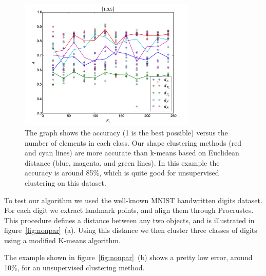 \documentclass[simplex.tex]{subfiles}
\begin{document}
\begin{figure}[h!]
\begin{cframed}
\centering
\includegraphics[width=0.75\textwidth]{./figs/nonpar135.png}
\caption{
The graph shows the accuracy
(1 is the best possible) versus the number of elements in each class.
Our shape clustering methods (red and cyan lines) are more accurate than
k-means based on Euclidean distance (blue, magenta, and green lines). In
this example the accuracy is around 85\%, which is quite good for
unsupervised clustering on this dataset.
}
\label{fig:nonpar135}
\end{cframed}
\end{figure}

To test our algorithm we used the well-known MNIST handwritten digits
dataset. For each digit we extract landmark points, and align them
through Procrustes. This procedure defines a distance between any two
objects, and is illustrated in figure~\ref{fig:nonpar}~(a). Using this
distance we then cluster three classes of digits using a modified
K-means algorithm. 

The example shown in figure~\ref{fig:nonpar}~(b)
shows a pretty low error, around 10\%, for an unsupervised clustering
method.
\end{document}
